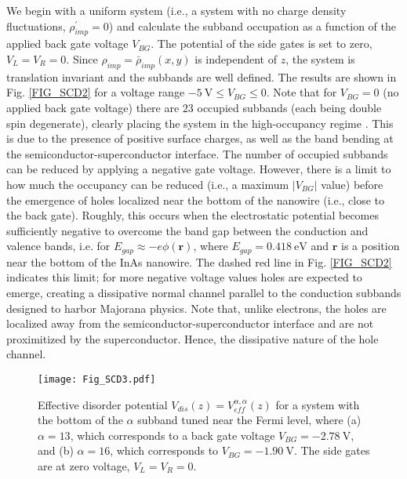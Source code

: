 \documentclass[aps,prmaterials,twocolumn,superscriptaddress,longbibliography]{revtex4-2}
\begin{document}
We begin with a uniform system (i.e., a system with no charge density fluctuations, $\rho^{\prime}_{imp} = 0$) and calculate the subband occupation as a function of the applied back gate voltage $V_{BG}$. The potential of the side gates is set to zero, $V_L = V_R = 0$. Since $\rho_{imp}=\bar{\rho}_{imp}(x,y)$ is independent of $z$, the system is translation invariant and the subbands are well defined. The results are shown in Fig. \ref{FIG_SCD2} for a voltage range $-5~\text{V} \leq V_{BG} \leq 0$. Note that for $V_{BG} = 0$ (no applied back gate voltage) there are $23$  occupied subbands (each being double spin degenerate), clearly placing the system in the high-occupancy regime \cite{woods2020subband}. This is due to the presence of positive surface charges, 
as well as the band bending at the semiconductor-superconductor interface.
The number of occupied subbands can be reduced by applying a negative gate voltage. However, there is a limit to how much the occupancy can be reduced (i.e., a maximum $|V_{BG}|$ value) before the emergence of holes localized near the bottom of the nanowire (i.e., close to the back gate).
Roughly, this occurs when the electrostatic potential becomes sufficiently negative to overcome the band gap between the conduction and valence bands, i.e. for $E_{gap} \approx -e\phi(\mathbf{r})$, where $E_{gap} = 0.418~\text{eV}$ \cite{winkler2003spinorbit} and $\mathbf{r}$ is a position near the bottom of the InAs nanowire.
The dashed red line in Fig. \ref{FIG_SCD2} indicates this limit; for more negative voltage values holes are expected to emerge, creating a  dissipative normal channel parallel to the conduction subbands designed to harbor Majorana physics. Note that, unlike electrons, the holes are localized away from the semiconductor-superconductor interface and are not proximitized by the superconductor. Hence, the dissipative nature of the hole channel. 

\begin{figure}[ht]
    \begin{center}
    \texttt{[image: Fig\_SCD3.pdf]}
    \end{center}
    \vspace{-.5cm}
    \caption{Effective disorder potential $V_{dis}(z) = V_{eff}^{\alpha,\alpha}(z)$ for a system with the bottom of the $\alpha$ subband tuned near the Fermi level, where (a) $\alpha = 13$, which corresponds to a back gate voltage  $V_{BG} = -2.78~\text{V}$, and (b) $\alpha = 16$, which corresponds to $V_{BG} = -1.90~\text{V}$. The side gates are at zero voltage, $V_L = V_R = 0$.} 
    \label{FIG_SCD3}
    \vspace{-1mm}
\end{figure}
\end{document}
